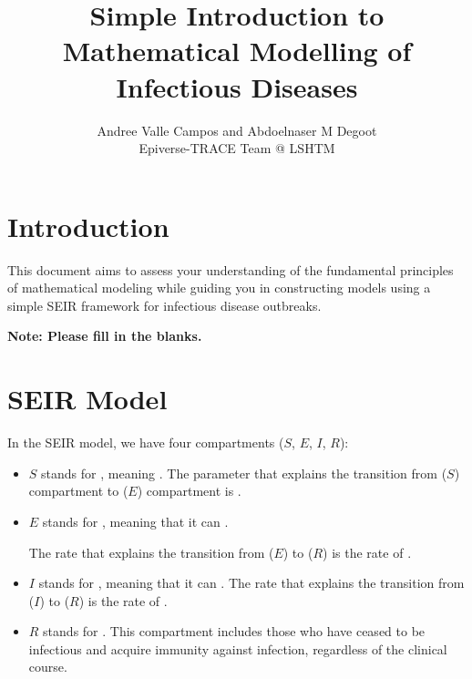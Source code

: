 \documentclass{article}
\author{Andree Valle Campos and Abdoelnaser M Degoot \\ Epiverse-TRACE Team @ LSHTM }
\title{Simple Introduction to Mathematical Modelling of Infectious Diseases}
\begin{document}
\maketitle

\section{Introduction}
This document aims to assess  your understanding of the fundamental 
principles of mathematical modeling while guiding you in constructing models using 
a simple SEIR framework for infectious disease outbreaks. 
 
 \textbf{Note: Please fill in the blanks.}

\section{SEIR Model}

 In the  SEIR model, we have four compartments (\( S \), \( E \), \( I \), \( R \)):

\begin{itemize}
    \item \( S \) stands for \underline{\hspace{2cm}}, meaning \underline{\hspace{3cm}}.
The parameter that explains the transition from  (\( S \)) compartment 
to  (\( E \)) compartment is \underline{\hspace{6cm}}.
\item \(E\) stands for \underline{\hspace{2cm}}, meaning that it can 
    \underline{\hspace{4cm}}. 
    
    The rate that explains the transition from  (\( E \)) to  (\( R \)) is the rate of \underline{\hspace{6cm}}.
    
    \item \( I \) stands for \underline{\hspace{2cm}}, meaning that it can 
    \underline{\hspace{3cm}}.
    The rate that explains the transition from  (\( I \)) to  (\( R \)) is the rate of \underline{\hspace{6cm}}.
    
    \item \( R \) stands for \underline{\hspace{3cm}}. This compartment includes those who have ceased to be infectious and acquire immunity against infection, regardless of the clinical course.
\end{itemize}
\end{document}
